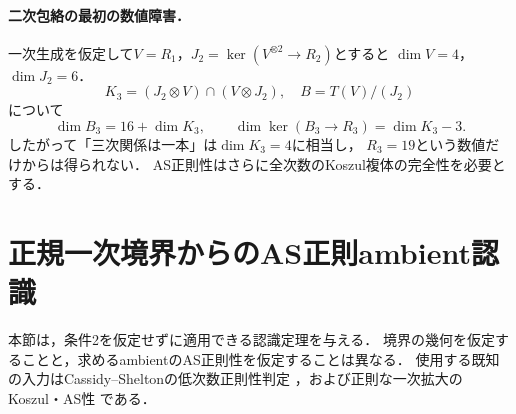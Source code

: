 \documentclass[11pt,a4paper]{ltjsarticle}
\theoremstyle{definition}\newtheorem{definition}[theorem]{定義}
\begin{document}
\paragraph{二次包絡の最初の数値障害．}
一次生成を仮定して$V=R_1$，$J_2=\ker(V^{\otimes2}\to R_2)$とすると
$\dim V=4$，$\dim J_2=6$．
\[
 K_3=(J_2\otimes V)\cap(V\otimes J_2),\quad B=T(V)/(J_2)
\]
について
\begin{equation}\label{eq:overlap}
 \dim B_3=16+\dim K_3,\qquad
 \dim\ker(B_3\to R_3)=\dim K_3-3.
\end{equation}
したがって「三次関係は一本」は$\dim K_3=4$に相当し，
$R_3=19$という数値だけからは得られない．
AS正則性はさらに全次数のKoszul複体の完全性を必要とする．


\section{正規一次境界からのAS正則ambient認識}
\label{sec:boundary-recognition}
本節は，条件2を仮定せずに適用できる認識定理を与える．
境界の幾何を仮定することと，求めるambientのAS正則性を仮定することは異なる．
使用する既知の入力はCassidy--Sheltonの低次数正則性判定
\cite[Theorems 1.3 and 1.5]{CS}，および正則な一次拡大のKoszul・AS性
\cite[Theorem 2.6, Corollary 2.7, Remark 2.8]{LBS}である．
\end{document}
